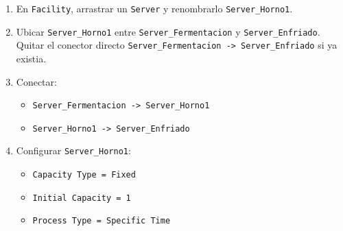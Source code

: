 \documentclass[11pt]{article}
\newcommand{\simio}[1]{\texttt{#1}}
\newcommand{\state}[1]{\texttt{#1}}
\newcommand{\proc}[1]{\texttt{#1}}
\begin{document}
\begin{enumerate}
\begin{enumerate}
\begin{enumerate}
    \end{enumerate}
    \item \textbf{Prerequisito 2: ya debe existir en el modelo.} En \simio{Model\_Panaderia > Definitions > States} deben estar \state{FamiliaActualHorno\_1}, \state{SetupCountHorno\_1} y \state{TiempoSetupTotal\_1}. Estos son \textbf{model states}, no entity states.
    \item \textbf{Prerequisito 3: crear el tally de espera de horno.}
    \begin{enumerate}
      \item En el panel derecho \simio{Navigation}, seleccionar \simio{Model\_Panaderia}.
      \item Abrir \simio{Definitions}.
      \item Entrar a \simio{Elements}.
      \item En la seccion de estadisticos, crear un \simio{Tally Statistic}.
      \item Nombrarlo exactamente \simio{Tally\_EsperaHorno}.
      \item No escribir ninguna formula aqui. Este elemento solo guarda observaciones; la formula se pone mas adelante en el paso \simio{Tally} de \proc{P\_Horno1\_Entrar}.
      \item Si \simio{Tally\_EsperaHorno} ya existe, no crear otro duplicado.
    \end{enumerate}
  \end{enumerate}
  \item En \simio{Facility}, arrastrar un \simio{Server} y renombrarlo \simio{Server\_Horno1}.
  \item Ubicar \simio{Server\_Horno1} entre \simio{Server\_Fermentacion} y \simio{Server\_Enfriado}. Quitar el conector directo \simio{Server\_Fermentacion -> Server\_Enfriado} si ya existia.
  \item Conectar:
  \begin{itemize}
    \item \simio{Server\_Fermentacion -> Server\_Horno1}
    \item \simio{Server\_Horno1 -> Server\_Enfriado}
  \end{itemize}
  \item Configurar \simio{Server\_Horno1}:
  \begin{itemize}
    \item \simio{Capacity Type = Fixed}
    \item \simio{Initial Capacity = 1}
    \item \simio{Process Type = Specific Time}

\end{itemize}
\end{enumerate}
\end{document}

